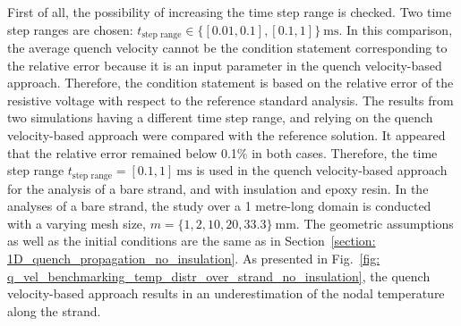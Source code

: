 First of all, the possibility of increasing the time step range is checked. Two time step ranges are chosen: $t_\text{step range} \in \{[0.01, 0.1], [0.1, 1]\}~\text{ms}$. In this comparison, the average quench velocity cannot be the condition statement corresponding to the relative error because it is an input parameter in the quench velocity-based approach. Therefore, the condition statement is based on the relative error of the resistive voltage with respect to the reference standard analysis. The results from two simulations having a different time step range, and relying on the quench velocity-based approach were compared with the reference solution. It appeared that the relative error remained below 0.1\% in both cases. Therefore, the time step range $t_\text{step range}=[0.1, 1]~\text{ms}$ is used in the quench velocity-based approach for the analysis of a bare strand, and with insulation and epoxy resin. In the analyses of a bare strand, the study over a 1 metre-long domain is conducted with a varying mesh size, $m=\{1, 2, 10, 20, 33.3\}~\text{mm}$. The geometric assumptions as well as the initial conditions are the same as in Section~\ref{section: 1D_quench_propagation_no_insulation}. As presented in Fig.~\ref{fig: q_vel_benchmarking_temp_distr_over_strand_no_insulation}, the quench velocity-based approach results in an underestimation of the nodal temperature along the strand. 

